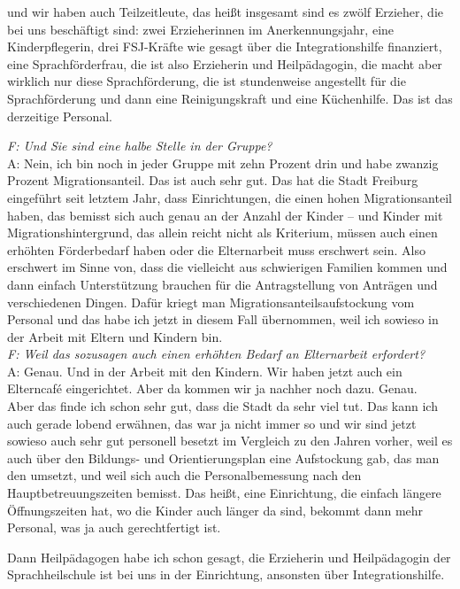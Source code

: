 \begin{linenumbers*}
und wir haben auch Teilzeitleute, das heißt insgesamt sind es zwölf Erzieher, die bei uns beschäftigt sind: zwei Erzieherinnen im Anerkennungsjahr, eine Kinderpflegerin, drei FSJ-Kräfte wie gesagt über die Integrationshilfe finanziert, eine Sprachförderfrau, die ist also Erzieherin und Heilpädagogin, die macht aber wirklich nur diese Sprachförderung, die ist stundenweise angestellt für die Sprachförderung und dann eine Reinigungskraft und eine Küchenhilfe. Das ist das derzeitige Personal. 

\emph{F: Und Sie sind eine halbe Stelle in der Gruppe?}\\
A: Nein, ich bin noch in jeder Gruppe mit zehn Prozent drin 
und habe zwanzig Prozent Migrationsanteil. Das ist auch sehr gut. Das hat die Stadt Freiburg eingeführt seit letztem Jahr, dass Einrichtungen, die einen hohen Migrationsanteil haben, das bemisst sich auch genau an der Anzahl der Kinder -- und Kinder mit Migrationshintergrund, das allein reicht nicht als Kriterium, müssen auch einen erhöhten Förderbedarf haben oder die Elternarbeit muss erschwert sein. Also erschwert im Sinne von, dass die vielleicht aus schwierigen Familien kommen und dann einfach Unterstützung brauchen für die Antragstellung von Anträgen und verschiedenen Dingen. Dafür kriegt man Migrationsanteilsaufstockung vom Personal und das habe ich jetzt in diesem Fall übernommen, weil ich sowieso in der Arbeit mit Eltern und Kindern bin.\\
\emph{F: Weil das sozusagen auch einen erhöhten Bedarf an Elternarbeit erfordert?}\\
A: Genau. Und in der Arbeit mit den Kindern. Wir haben jetzt auch ein Elterncafé eingerichtet. Aber da kommen wir ja nachher noch dazu. Genau.\\
Aber das finde ich schon sehr gut, dass die Stadt da sehr viel tut. Das kann ich auch gerade lobend erwähnen, das war ja nicht immer so und wir sind jetzt sowieso auch sehr gut personell besetzt im Vergleich zu den Jahren vorher, weil es auch über den Bildungs- und Orientierungsplan eine Aufstockung gab, das man den umsetzt, und weil sich auch die Personalbemessung nach den Hauptbetreuungszeiten bemisst. Das heißt, eine Einrichtung, die einfach längere Öffnungszeiten hat, wo die Kinder auch länger da sind, bekommt dann mehr Personal, was ja auch gerechtfertigt ist.  

Dann Heilpädagogen habe ich schon gesagt, die Erzieherin und Heilpädagogin der Sprachheilschule ist bei uns in der Einrichtung, ansonsten über Integrationshilfe.  


\end{linenumbers*}
